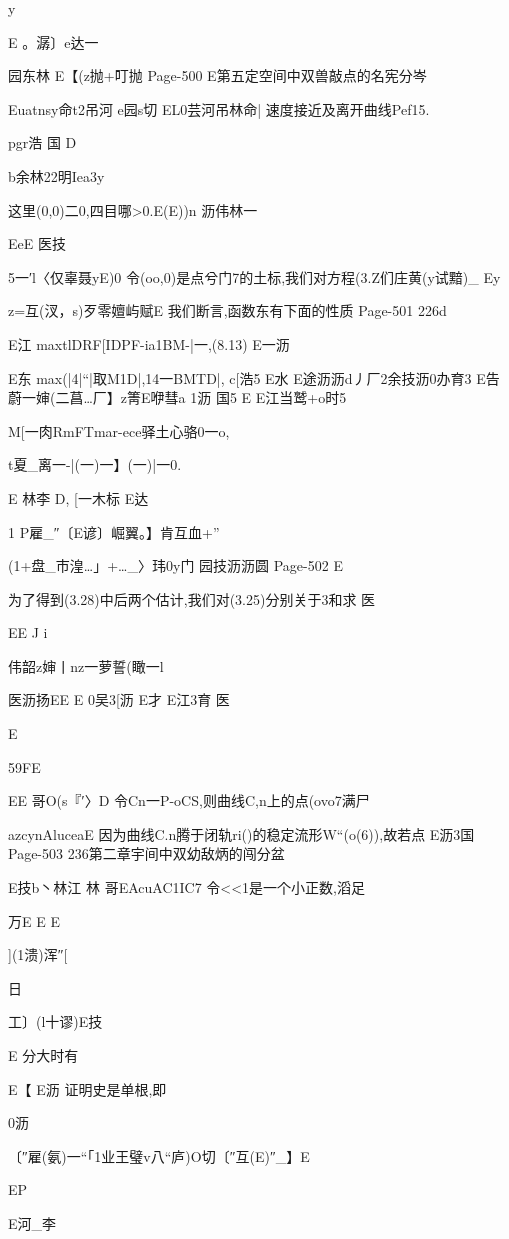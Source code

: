 {{{{{{y

E
。潺〕e达一

园东林
E【(z抛+叮抛%
Page-500
E第五定空间中双兽敲点的名宪分岑

Euatnsy命t2吊河
e园s切
EL0芸河吊林命|
速度接近及离开曲线Pef15.

pgr浩
国
D

b余林22明Iea3y

这里(0,0)二0,四目哪>0.E(E))n
沥伟林一

EeE
医技

5一′l〈仅辜聂yE)0
令(oo,0)是点兮门7的土标,我们对方程(3.Z们庄黄(y试黯)_
Ey

z=互(汊，s)歹零嬗屿赋E
我们断言,函数东有下面的性质
Page-501
226d

E江
maxtlDRF[IDPF-ia1BM-|一,(8.13)
E一沥

E东
max(|4|“|取M1D|,14一BMTD|,
c[浩5
E水
E途沥沥d丿厂2余技沥0办育3
E告蔚一婶(二菖…厂】z箐E咿彗a
1沥
国5
E
E江当鹫+o时5

M[一肉RmFTmar-ece驿土心骆0一o,

t夏_离一-|(一)一】(一)|一0.

E
林李
D,
[一木标
E达

1
P雇_″〔E谚〕崛翼。】肯互血+”

(1+盘_市湟…」+…_〉玮0y门
园技沥沥圆
Page-502
E

为了得到(3.28)中后两个估计,我们对(3.25)分别关于3和求
医

EE
J
i

伟韶z婶丨nz一萝誓(瞰一l

医沥扬EE
E
0吴3[沥
E才
E江3育
医

E

59FE

EE
哥O(s『′〉D
令Cn一P-oCS,则曲线C,n上的点(ovo7满尸

azcynAluceaE
因为曲线C.n腾于闭轨ri()的稳定流形W“(o(6)),故若点
E沥3国
Page-503
236第二章宇间中双幼敌炳的闯分盆

E技b丶林江
林
哥EAcuAC1IC7
令<<1是一个小正数,滔足

万E
E
E

](1溃)浑″[

日

工〕(l十谬)E技

E
分大时有

E【
E沥
证明史是单根,即

0沥

〔″雇(氨)一“「1业王璧v八“庐)O切〔″互(E)″_】E

EP

E河_李

}}}}}}
